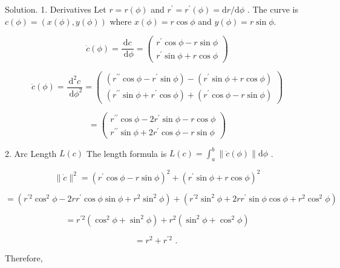 \documentclass[10pt]{article}
\begin{document}
Solution. 1. Derivatives Let \(r = r\left( \phi \right)\) and \({r}^{\prime } = {r}^{\prime }\left( \phi \right)  = \mathrm{d}r/\mathrm{d}\phi\) . The curve is \(c\left( \phi \right)  = \left( {x\left( \phi \right) ,y\left( \phi \right) }\right)\) where \(x\left( \phi \right)  = r\cos \phi\) and \(y\left( \phi \right)  = r\sin \phi .\)

\[
\dot{c}\left( \phi \right)  = \frac{\mathrm{d}c}{\mathrm{\;d}\phi } = \left( \begin{array}{l} {r}^{\prime }\cos \phi  - r\sin \phi \\  {r}^{\prime }\sin \phi  + r\cos \phi  \end{array}\right)
\]

\[
\ddot{c}\left( \phi \right)  = \frac{{\mathrm{d}}^{2}c}{\mathrm{\;d}{\phi }^{2}} = \left( \begin{matrix} \left( {{r}^{\prime \prime }\cos \phi  - {r}^{\prime }\sin \phi }\right)  - \left( {{r}^{\prime }\sin \phi  + r\cos \phi }\right) \\  \left( {{r}^{\prime \prime }\sin \phi  + {r}^{\prime }\cos \phi }\right)  + \left( {{r}^{\prime }\cos \phi  - r\sin \phi }\right)  \end{matrix}\right)
\]

\[
= \left( \begin{array}{l} {r}^{\prime \prime }\cos \phi  - 2{r}^{\prime }\sin \phi  - r\cos \phi \\  {r}^{\prime \prime }\sin \phi  + 2{r}^{\prime }\cos \phi  - r\sin \phi  \end{array}\right)
\]

2. Arc Length \(L\left( c\right)\) The length formula is \(L\left( c\right)  = {\int }_{a}^{b}\parallel \dot{c}\left( \phi \right) \parallel \mathrm{d}\phi\) .

\[
\parallel \dot{c}{\parallel }^{2} = {\left( {r}^{\prime }\cos \phi  - r\sin \phi \right) }^{2} + {\left( {r}^{\prime }\sin \phi  + r\cos \phi \right) }^{2}
\]

\[
= \left( {{r}^{\prime 2}{\cos }^{2}\phi  - {2r}{r}^{\prime }\cos \phi \sin \phi  + {r}^{2}{\sin }^{2}\phi }\right)  + \left( {{r}^{\prime 2}{\sin }^{2}\phi  + {2r}{r}^{\prime }\sin \phi \cos \phi  + {r}^{2}{\cos }^{2}\phi }\right)
\]

\[
= {r}^{\prime 2}\left( {{\cos }^{2}\phi  + {\sin }^{2}\phi }\right)  + {r}^{2}\left( {{\sin }^{2}\phi  + {\cos }^{2}\phi }\right)
\]

\[
= {r}^{2} + {r}^{\prime 2}\text{ . }
\]

Therefore,
\end{document}
